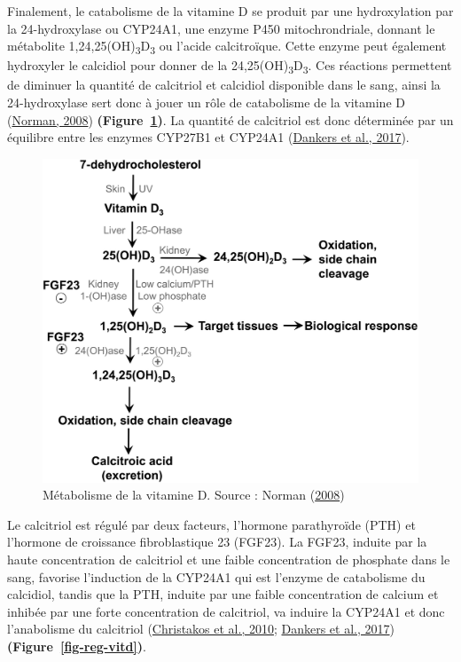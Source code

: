 \documentclass[
  letterpaper,
  DIV=11,
  numbers=noendperiod]{scrartcl}
\begin{document}
Finalement, le catabolisme de la vitamine D se produit par une
hydroxylation par la 24-hydroxylase ou CYP24A1, une enzyme P450
mitochrondriale, donnant le métabolite
1,24,25(OH)\textsubscript{3}D\textsubscript{3} ou l'acide calcitroïque.
Cette enzyme peut également hydroxyler le calcidiol pour donner de la
24,25(OH)\textsubscript{3}D\textsubscript{3}. Ces réactions permettent
de diminuer la quantité de calcitriol et calcidiol disponible dans le
sang, ainsi la 24-hydroxylase sert donc à jouer un rôle de catabolisme
de la vitamine D (\protect\hyperlink{ref-Norman.2008}{Norman, 2008})
\textbf{(Figure~\ref{fig-metabolism-vitd})}. La quantité de calcitriol
est donc déterminée par un équilibre entre les enzymes CYP27B1 et
CYP24A1 (\protect\hyperlink{ref-Dankers.2017}{Dankers et al., 2017}).

\begin{figure}

{\centering \includegraphics{figures/vitamin-d-metabolism.png}

}

\caption{\label{fig-metabolism-vitd}Métabolisme de la vitamine D. Source
: Norman (\protect\hyperlink{ref-Norman.2008}{2008})}

\end{figure}

Le calcitriol est régulé par deux facteurs, l'hormone parathyroïde (PTH)
et l'hormone de croissance fibroblastique 23 (FGF23). La FGF23, induite
par la haute concentration de calcitriol et une faible concentration de
phosphate dans le sang, favorise l'induction de la CYP24A1 qui est
l'enzyme de catabolisme du calcidiol, tandis que la PTH, induite par une
faible concentration de calcium et inhibée par une forte concentration
de calcitriol, va induire la CYP24A1 et donc l'anabolisme du calcitriol
(\protect\hyperlink{ref-Christakos.2010}{Christakos et al., 2010};
\protect\hyperlink{ref-Dankers.2017}{Dankers et al., 2017})
\textbf{(Figure~\ref{fig-reg-vitd})}.
\end{document}
